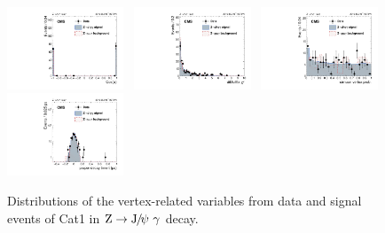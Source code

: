 \begin{figure}[p]
		  \includegraphics[width=0.31\textwidth]{Fig/Final_NoPreliminary/ZJpsiG/CosAlpha_Norm_EBHR9}~
		  \includegraphics[width=0.31\textwidth]{Fig/Final_NoPreliminary/ZJpsiG/diMuChi2_Norm_EBHR9}~
		  \includegraphics[width=0.31\textwidth]{Fig/Final_NoPreliminary/ZJpsiG/VtxProb_Norm_EBHR9}\\
		  \includegraphics[width=0.31\textwidth]{Fig/Final_NoPreliminary/ZJpsiG/ctau_narrowAltBins_EBHR9}\\
		
		  \caption{Distributions of the vertex-related variables from data and signal events of Cat1 in $\cPZ\to\JPsi\ \gamma$ decay.}
		  \label{fig:vtx_zjpsig_cat1}
		\end{figure}
		\clearpage
		
